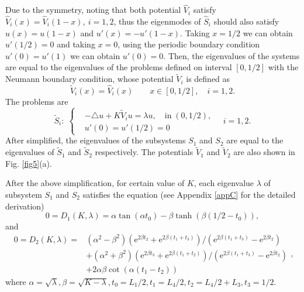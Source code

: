 \documentclass[a4paper,11pt]{article}
\begin{document}
Due to the symmetry, noting that both potential $\hat{V}_i$ satisfy $\hat{V}_i(x) = \hat{V}_i(1-x), \ i = 1, 2$, thus the eigenmodes of $\hat{S}_i$ should also satisfy $u(x) = u(1-x)$ and $u'(x) = -u'(1-x)$. Taking $x = 1/2$ we can obtain $u'(1/2)=0$ and taking $x = 0$, using the periodic boundary condition $u'(0) = u'(1)$ we can obtain $u'(0) =0$. Then, the eigenvalues of the systems are equal to the eigenvalues of the problems defined on interval $[0, 1/2]$ with the Neumann boundary condition, whose potential $\tilde{V}_i$ is defined as
\begin{equation*}
\tilde{V}_i(x) = \hat{V}_i(x) \qquad x \in [0, 1/2], \quad i = 1, 2.
\end{equation*}
The problems are
\begin{equation}
\tilde{S}_i: \;
\left\{
\begin{split}
& -\triangle u + K \tilde{V}_i u = \lambda u, \quad \textrm{in} \; (0, 1/2), \\
& u'(0) = u'(1/2) = 0
\end{split}
\right.
\quad
i = 1, 2.
\end{equation}
After simplified, the eigenvalues of the subsystems $S_1$ and $S_2$ are equal to the eigenvalues of $\tilde{S}_1$ and $\tilde{S}_2$ respectively. The potentials $\tilde{V}_1$ and $\tilde{V}_2$ are also shown in Fig. \ref{fig5}(a).

After the above simplification, for certain value of $K$, each eigenvalue $\lambda$ of subsystem $S_1$ and $S_2$ satisfies the equation (see Appendix \ref{appC} for the detailed derivation)
\begin{equation}\label{phase1}
0 = D_1(K, \lambda) = \alpha \tan(\alpha t_0) - \beta \tanh(\beta (1/2 - t_0)),
\end{equation}
and
\begin{equation}\label{phase2}
\begin{split}
0 = D_2(K, \lambda) = & (\alpha^2 - \beta^2)(\mathrm{e}^{2 \beta t_2} + \mathrm{e}^{2 \beta (t_1+t_3)}) / (\mathrm{e}^{2 \beta (t_1+t_3)} - \mathrm{e}^{2 \beta t_2}) \\
& + (\alpha^2 + \beta^2)(\mathrm{e}^{2 \beta t_3} + \mathrm{e}^{2 \beta (t_1+t_2)}) / (\mathrm{e}^{2 \beta (t_1+t_3)} - \mathrm{e}^{2 \beta t_2}) \\
& + 2 \alpha \beta \cot(\alpha (t_1 - t_2))
\end{split},
\end{equation}
where $\alpha = \sqrt{\lambda}, \beta = \sqrt{K - \lambda}, t_0 = L_1 / 2, t_1 = L_4 / 2, t_2 = L_4 / 2 + L_3, t_3 = 1 / 2$.
\end{document}
